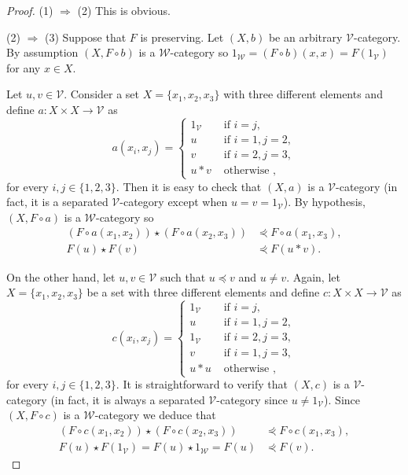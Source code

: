 \documentclass[11pt,a4paper]{amsart}
\theoremstyle{definition}
\begin{document}
	\begin{proof}
		(1) $\Rightarrow$ (2) This is obvious.
		
		(2) $\Rightarrow$ (3)	Suppose that $F$ is preserving. Let $(X,b)$ be an arbitrary $\mathscr{V}$-category. By assumption $(X,F\circ b)$ is a $\mathscr{W}$-category so $1_\mathscr{W}=(F\circ b)(x,x)=F(1_\mathscr{V})$ for any $x\in X.$
		
		Let $u,v\in\mathscr{V}.$ Consider a set $X=\{x_1,x_2,x_3\}$ with three different elements and define $a:X\times X\to\mathscr{V}$ as
		$$a(x_i,x_j)=\begin{cases}
			1_\mathscr{V}&\text{ if }i=j,\\
			u&\text{ if }i=1, j=2,\\
			v&\text{ if }i=2, j=3 ,\\
			u\ast v&\text{ otherwise },
		\end{cases}$$
		for every $i,j\in\{1,2,3\}.$
		Then it is easy to check that  $(X,a)$ is a $\mathscr{V}$-category (in fact, it is a separated $\mathscr{V}$-category except when $u=v=1_\mathscr{V}$). By hypothesis, $(X,F\circ a)$ is a $\mathscr{W}$-category so
		\begin{align*}
			(F\circ a(x_1,x_2))\star (F\circ a(x_2,x_3))&\curlyeqprec F\circ a(x_1,x_3),\\
			F(u)\star F(v)&\curlyeqprec F (u\ast v).
		\end{align*}
		
		On the other hand, let $u,v\in \mathscr{V}$ such that $u\preceq v$ and $u\neq v.$ Again, let $X=\{x_1,x_2,x_3\}$ be a set with three different elements and define $c:X\times X\to\mathscr{V}$ as
		$$c(x_i,x_j)=\begin{cases}
			1_\mathscr{V}&\text{ if }i=j,\\
			u&\text{ if }i=1, j=2,\\
			1_\mathscr{V}&\text{ if }i=2, j=3 ,\\
			v&\text{ if }i=1, j=3 ,\\
			u\ast u&\text{ otherwise },
		\end{cases}$$
		for every $i,j\in\{1,2,3\}.$ 	
		It is straightforward to verify that $(X,c)$ is a $\mathscr{V}$-category (in fact, it is always a separated $\mathscr{V}$-category since $u\neq 1_\mathscr{V}$).  Since $(X,F\circ c)$ is a $\mathscr{W}$-category we deduce that
		\begin{align*}
			(F\circ c(x_1,x_2))\star (F\circ c(x_2,x_3))&\curlyeqprec F\circ c(x_1,x_3),\\
			F(u)\star F(1_\mathscr{V})=F(u)\star 1_\mathscr{W}=F(u)&\curlyeqprec F (v).
		\end{align*}
		

\end{proof}
\end{document}
